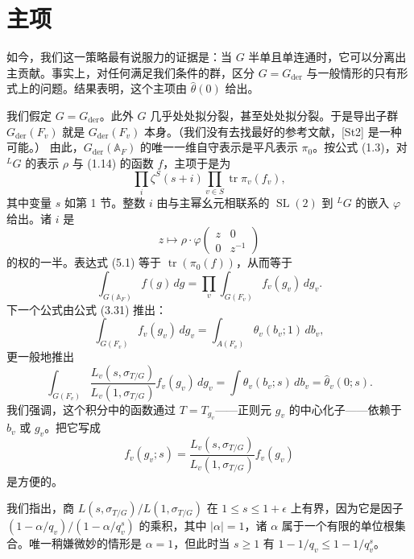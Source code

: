 \section{主项}

如今，我们这一策略最有说服力的证据是：当 $G$ 半单且单连通时，它可以分离出主贡献。事实上，对任何满足我们条件的群，区分 $G=G_{\mathrm{der}}$ 与一般情形的只有形式上的问题。结果表明，这个主项由 $\hat\theta(0)$ 给出。

我们假定 $G=G_{\mathrm{der}}$。此外 $G$ 几乎处处拟分裂，甚至处处拟分裂。于是导出子群 $G_{\mathrm{der}}(F_v)$ 就是 $G_{\mathrm{der}}(F_v)$ 本身。（我们没有去找最好的参考文献，[St2] 是一种可能。） 由此，$G_{\mathrm{der}}(\mathbb A_F)$ 的唯一一维自守表示是平凡表示 $\pi_0$。按公式 (1.3)，对 $^LG$ 的表示 $\rho$ 与 (1.14) 的函数 $f$，主项于是为
\begin{equation}\tag{5.1}
\prod_i\zeta^S(s+i)\prod_{v\in S}\operatorname{tr}\pi_v(f_v),
\end{equation}
其中变量 $s$ 如第 1 节。整数 $i$ 由与主幂幺元相联系的 $\operatorname{SL}(2)$ 到 $^LG$ 的嵌入 $\varphi$ 给出。诸 $i$ 是
\[
z\mapsto\rho\cdot\varphi\begin{pmatrix}z&0\\0&z^{-1}\end{pmatrix}
\]
的权的一半。表达式 (5.1) 等于 $\operatorname{tr}(\pi_0(f))$，从而等于
\[
\int_{G(\mathbb A_F)}f(g)\,dg=\prod_v\int_{G(F_v)}f_v(g_v)\,dg_v.
\]
下一个公式由公式 (3.31) 推出：
\begin{equation}\tag{5.2}
\int_{G(F_v)}f_v(g_v)\,dg_v=\int_{A(F_v)}\theta_v(b_v;1)\,db_v,
\end{equation}
更一般地推出
\begin{equation}\tag{5.3}
\int_{G(F_v)}\frac{L_v(s,\sigma_{T/G})}{L_v(1,\sigma_{T/G})}f_v(g_v)\,dg_v
=\int\theta_v(b_v;s)\,db_v=\hat\theta_v(0;s).
\end{equation}
我们强调，这个积分中的函数通过 $T=T_{g_v}$——正则元 $g_v$ 的中心化子——依赖于 $b_v$ 或 $g_v$。把它写成
\[
f_v(g_v;s)=\frac{L_v(s,\sigma_{T/G})}{L_v(1,\sigma_{T/G})}f_v(g_v)
\]
是方便的。

我们指出，商 $L(s,\sigma_{T/G})/L(1,\sigma_{T/G})$ 在 $1\le s\le1+\epsilon$ 上有界，因为它是因子 $(1-\alpha/q_v)/(1-\alpha/q_v^s)$ 的乘积，其中 $|\alpha|=1$，诸 $\alpha$ 属于一个有限的单位根集合。唯一稍嫌微妙的情形是 $\alpha=1$，但此时当 $s\ge1$ 有 $1-1/q_v\le1-1/q_v^s$。

